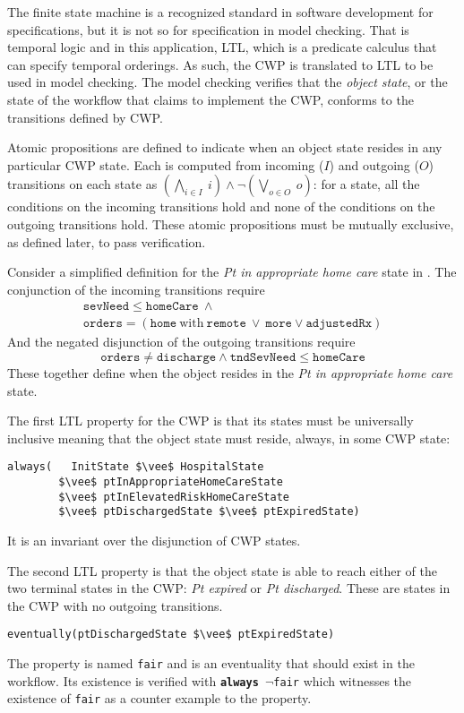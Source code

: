 The finite state machine is a recognized standard in software development for specifications, but it is not so for specification in model checking.
That is temporal logic and in this application, LTL, which is a predicate calculus that can specify temporal orderings.
As such, the CWP is translated to LTL to be used in model checking.
The model checking verifies that the \emph{object state}, or the state of the workflow that claims to implement the CWP, conforms to the transitions defined by CWP.

Atomic propositions are defined to indicate when an object state resides in any particular CWP state.
Each is computed from incoming ($I$) and outgoing ($O$) transitions on each state as $(\bigwedge_{i \in I}\ i) \wedge \neg(\bigvee_{o \in O}\ o)$: for a state, all the conditions on the incoming transitions hold and none of the conditions on the outgoing transitions hold.
These atomic propositions must be mutually exclusive, as defined later, to pass verification.

Consider a simplified definition for the \emph{Pt in appropriate home care} state in . The conjunction of the incoming transitions require
%
\[
\begin{array}{l}
  \mathtt{sevNeed} \le \mathtt{homeCare}\ \wedge\ \\
  \mathtt{orders} = (\mathtt{home}\ \mathrm{with}\ \mathtt{remote}\ \vee\ 
                    \mathtt{more} \vee \mathtt{adjustedRx})
\end{array}
\]
%
And the negated disjunction of the outgoing transitions require
%
\[
  \mathtt{orders} \neq \mathtt{discharge} \wedge \mathtt{tndSevNeed} \le \mathtt{homeCare}
\]
%
\noindent These together define when the object resides in the \emph{Pt in appropriate home care} state.

The first LTL property for the CWP is that its states must be universally inclusive meaning that the object state must reside, always, in some CWP state:
%
{\small
\begin{lstlisting}[style=myPromela,mathescape=true]
always(   InitState $\vee$ HospitalState 
        $\vee$ ptInAppropriateHomeCareState 
        $\vee$ ptInElevatedRiskHomeCareState 
        $\vee$ ptDischargedState $\vee$ ptExpiredState)
\end{lstlisting}
}
%
\noindent It is an invariant over the disjunction of CWP states.

The second LTL property is that the object state is able to reach either of the two terminal states in the CWP: \emph{Pt expired} or \emph{Pt discharged}.
These are states in the CWP with no outgoing transitions.
%
{\small
\begin{lstlisting}[style=myPromela,mathescape=true]
eventually(ptDischargedState $\vee$ ptExpiredState)
\end{lstlisting}
}
%
\noindent The property is named \texttt{fair} and is an eventuality that should exist in the workflow.
Its existence is verified with \texttt{\textbf{always} $\neg$fair} which witnesses the existence of \texttt{fair} as a counter example to the property.


